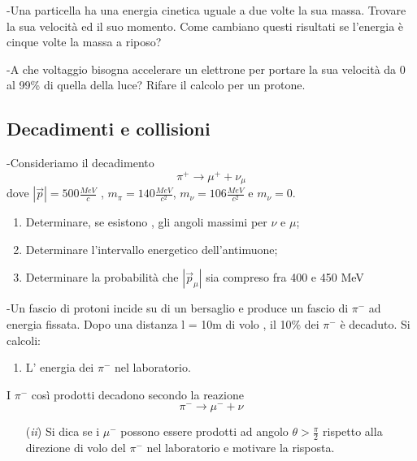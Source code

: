 \documentclass[12pt,twoside,a4]{article}
\begin{document}
\newpage
\begin{esercizio}
	-Una particella ha una energia cinetica uguale a due volte la sua massa. Trovare la sua velocità  ed il suo momento. Come cambiano questi risultati se l'energia  è cinque volte la massa a riposo?
\end{esercizio}

\begin{esercizio}
	-A che voltaggio bisogna accelerare un elettrone per portare la sua velocità  da 0 al 99\% di quella della luce? Rifare il calcolo per un protone.
\end{esercizio}


\newpage
\subsection{Decadimenti e collisioni}
\begin{esercizio}
	-Consideriamo il decadimento
\begin{equation*}
	\pi^+ \rightarrow \mu ^+ + \nu_\mu
\end{equation*}
dove $| \vec p | = 500 \frac{MeV}{c}$ , $m_\pi=140 \frac{MeV}{c^2}$, $m_\nu=106 \frac{MeV}{c^2}$ e $m_\nu=0$. 
\begin{enumerate}[label=(\textit{\roman*})]
	\item Determinare, se esistono , gli angoli massimi per $\nu$ e $\mu$;
	\item Determinare l'intervallo energetico dell'antimuone;
	\item Determinare la probabilità  che $| \vec p_\mu|$ sia compreso fra 400 e 450 MeV
\end{enumerate}
\end{esercizio}

\begin{esercizio}
	-Un fascio di protoni incide su di un bersaglio e produce un fascio di $\pi^-$ ad energia fissata. Dopo una distanza l = 10m di volo , il 10\% dei $\pi^-$ è decaduto. Si calcoli:
	\begin{enumerate}[label=(\textit{\roman*})]
		\item L' energia dei $\pi^-$ nel laboratorio.
	\end{enumerate}
	I $\pi^-$ così prodotti decadono secondo la reazione
\begin{equation*}
	\pi^- \rightarrow \mu^- + \nu
\end{equation*}
\begin{enumerate}[label=(\textit{\roman*})]
	\item[(\textit{ii})] Si dica se i $\mu^-$ possono essere prodotti ad angolo $\theta > \frac{\pi}{2}$ rispetto alla direzione di volo del $\pi^-$ nel laboratorio e motivare la risposta.
\end{enumerate}
\end{esercizio}
\end{document}
